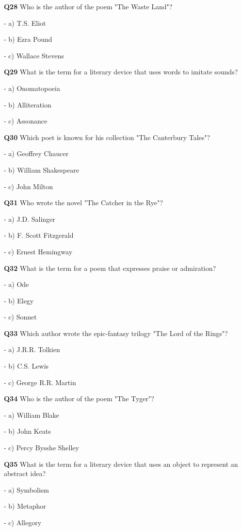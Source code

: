 \textbf{Q28} Who is the author of the poem "The Waste Land"?\par
\quad - a) T.S. Eliot\par
\quad - b) Ezra Pound\par
\quad - c) Wallace Stevens\par

\textbf{Q29} What is the term for a literary device that uses words to imitate sounds?\par
\quad - a) Onomatopoeia\par
\quad - b) Alliteration\par
\quad - c) Assonance\par

\textbf{Q30} Which poet is known for his collection "The Canterbury Tales"?\par
\quad - a) Geoffrey Chaucer\par
\quad - b) William Shakespeare\par
\quad - c) John Milton\par

\textbf{Q31} Who wrote the novel "The Catcher in the Rye"?\par
\quad - a) J.D. Salinger\par
\quad - b) F. Scott Fitzgerald\par
\quad - c) Ernest Hemingway\par

\textbf{Q32} What is the term for a poem that expresses praise or admiration?\par
\quad - a) Ode\par
\quad - b) Elegy\par
\quad - c) Sonnet\par

\textbf{Q33} Which author wrote the epic‑fantasy trilogy "The Lord of the Rings"?\par
\quad - a) J.R.R. Tolkien\par
\quad - b) C.S. Lewis\par
\quad - c) George R.R. Martin\par

\textbf{Q34} Who is the author of the poem "The Tyger"?\par
\quad - a) William Blake\par
\quad - b) John Keats\par
\quad - c) Percy Bysshe Shelley\par

\textbf{Q35} What is the term for a literary device that uses an object to represent an abstract idea?\par
\quad - a) Symbolism\par
\quad - b) Metaphor\par
\quad - c) Allegory\par

